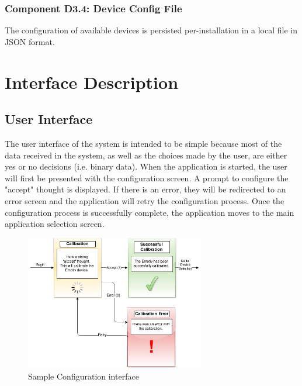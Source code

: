 \documentclass{article}
\begin{document}
\subsubsection{Component D3.4: Device Config File}
The configuration of available devices is persisted per-installation in a
local file in JSON format.

\newpage

\section{Interface Description}

\subsection{User Interface}

The user interface of the system is intended to be simple because most of
the data received in the system, as well as the choices made by the user,
are either yes or no decisions (i.e. binary data). When the application is
started, the user will first be presented with the configuration screen. A
prompt to configure the "accept" thought is displayed. If there is an error, they will be redirected to an error screen and the application will retry the configuration process. Once the configuration process is successfully complete, the application moves to the main application selection screen. 

\begin{figure}[h!]
	
  \centering
    \includegraphics[width=0.7\textwidth]{ConfigurationUI}
   \caption{Sample Configuration interface}
   \label{fig:config}
\end{figure}
\end{document}
